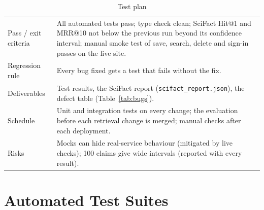 \begin{table}[!htbp]
\begin{tabularx}{\textwidth}{>{\raggedright\arraybackslash}p{} L}
Pass / exit criteria & All automated tests pass; type check clean; SciFact Hit@1 and MRR@10 not below the previous run beyond its confidence interval; manual smoke test of save, search, delete and sign-in passes on the live site. \\
Regression rule & Every bug fixed gets a test that fails without the fix. \\
Deliverables & Test results, the SciFact report (\texttt{scifact\_report.json}), the defect table (Table~\ref{tab:bugs}). \\
Schedule & Unit and integration tests on every change; the evaluation before each retrieval change is merged; manual checks after each deployment. \\
Risks & Mocks can hide real-service behaviour (mitigated by live checks); 100 claims give wide intervals (reported with every result). \\
\bottomrule
\end{tabularx}
\caption{Test plan}
\label{tab:testplan}
\end{table}

\section{Automated Test Suites}

